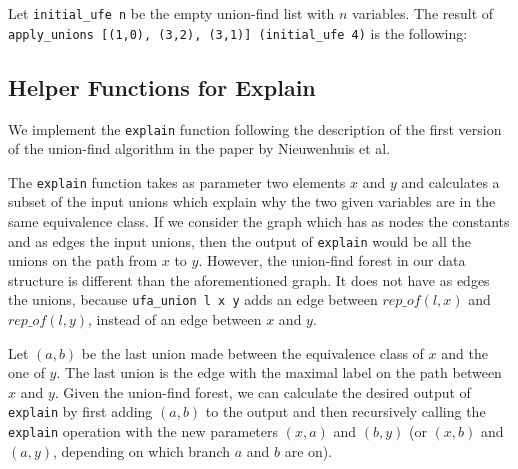 \begin{exmp}\label{example:apply-unions}
Let \lstinline|initial_ufe n| be the empty union-find list with $n$ variables. The result of \lstinline|apply_unions [(1,0), (3,2), (3,1)] (initial_ufe 4)| is the following:

\begin{center}
\end{center}
\end{exmp}

\subsection{Helper Functions for Explain}\label{subsection:helper-functions}

We implement the \lstinline|explain| function following the description of the first version of the union-find algorithm in the paper by Nieuwenhuis et al. \cite{Nieuwenhuis}

The \lstinline|explain| function takes as parameter two elements $x$ and $y$ and calculates a subset of the input unions which explain why the two given variables are in the same equivalence class. If we consider the graph which has as nodes the constants and as edges the input unions, then the output of \lstinline|explain| would be all the unions on the path from $x$ to $y$. However, the union-find forest in our data structure is different than the aforementioned graph. It does not have as edges the unions, because \lstinline|ufa_union l x y| adds an edge between $rep\_of(l, x)$ and $rep\_of(l, y)$, instead of an edge between $x$ and $y$.

Let $(a, b)$ be the last union made between the equivalence class of $x$ and the one of $y$.
The last union is the edge with the maximal label on the path between $x$ and $y$.
Given the union-find forest, we can calculate the desired output of \lstinline|explain| by first adding  $(a, b)$ to the output and then recursively calling the \lstinline|explain| operation with the new parameters $(x, a)$ and $(b, y)$ (or $(x, b)$ and $(a, y)$, depending on which branch $a$ and $b$ are on).


